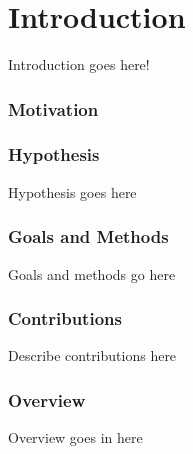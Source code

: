 \chapter{Introduction}\label{ch:introduction}


Introduction goes here!

\subsection{Motivation} %
\label{sub:context_and_motivation}

\subsection{Hypothesis} %
\label{sub:hypothesis}

Hypothesis goes here

\subsection{Goals and Methods} %
\label{sub:goals_and_methods}

Goals and methods go here

\subsection{Contributions} %
\label{sub:contributions}

Describe contributions here


\subsection{Overview} %
\label{sub:overview}

Overview goes in here



